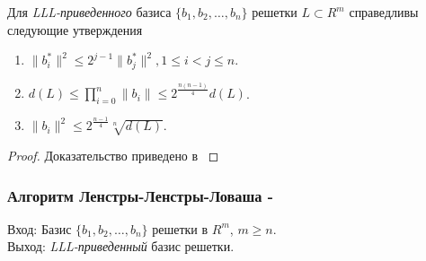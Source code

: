   \begin{theorem}
   Для \textit{LLL-приведенного} базиса {$\{ b_1, b_2, \dots, b_n \}$} решетки {$L \subset R^m$} справедливы следующие утверждения
   
   \begin{enumerate}
    \item $ \lVert b_i^* \lVert^2 \le 2^{j-1} \lVert b_j^* \lVert^2, 1 \le i < j \le n  $.
    \item $ d(L) \le \prod_{i=0}^{n}{ \lVert b_i \lVert } \le 2^{\frac{n(n-1)}{4}} d(L) $.
    \item $ \lVert b_i \lVert^2 \le 2^{\frac{n-1}{4}} \sqrt[n]{d(L)} $.
   \end{enumerate}

   \begin{proof}
      Доказательство приведено в \cite[Глава 8.2, страница 266]{mah06}
   \end{proof}

  \end{theorem}
  
  \subsubsection{Алгоритм Ленстры-Ленстры-Ловаша - \cite[Глава 8, страницы 256-273]{mah06}}
    Вход: Базис {$\{ b_1,b_2, \dots, b_n \}$} решетки в {$R^m$}, {$m \ge n$}. \\
    Выход: \textit{LLL-приведенный} базис решетки.
  
